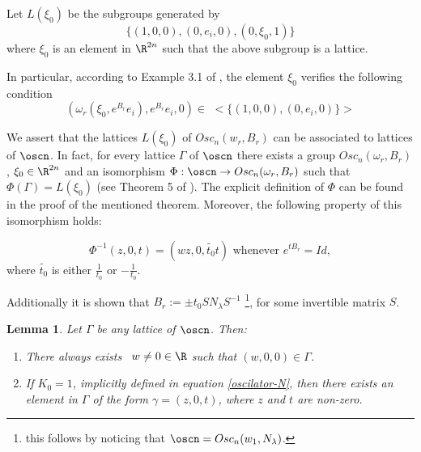 \documentclass[12pt]{amsart}
\theoremstyle{plain}
\newtheorem{lem}[thm]{Lemma}
\theoremstyle{definition}
\theoremstyle{remark}
\begin{document}
	Let $L(\xi_0)$ be the subgroups generated by $$\{ (1,0,0),(0,e_i,0),(0,\xi_0, 1) \}$$ where $\xi_0$ is an element in $\R^{2n}$ such that the above subgroup is a lattice. 
	
In particular, according to Example 3.1 of \cite{MF}, the element $\xi_0$ verifies the following condition 
	\begin{equation}\label{xi-condition}
		(\omega_r(\xi_0, e^{B_r}e_i), e^{B_r} e_i, 0) \in \,\, <\{ (1,0,0),(0,e_i,0) \}>
	\end{equation}
	
	
We assert that  the lattices $L(\xi_0)$ of $Osc_n(w_r, B_r)$ can be associated to lattices of $\oscn$. In fact, for every lattice $\Gamma$ of $\oscn$ there exists a group $Osc_n(\omega_r, B_r)$, $\xi_0 \in \R^{2n}$ and an isomorphism $\Phi: \oscn \rightarrow Osc_n(\omega_r, B_r)$ such that $\Phi(\Gamma) = L(\xi_0)$ (see Theorem 5 of \cite{MF}). 	
	The explicit definition of $\Phi$ can be found in the proof of the mentioned theorem. Moreover, the following property of this isomorphism holds:
	
	\begin{equation} \label{condition-exp}
		\Phi^{-1}(z,0,t) = (w z, 0, \widetilde{t_0} t ) \mbox{ whenever } e^{t B_r} = Id,
		\end{equation}
    where $\widetilde{t_0}$ is either $\frac{1}{t_0}$ or $-\frac{1}{t_0}$.

	Additionally it is shown that $B_r := \pm t_0 S N_{\lambda} S^{-1}$ \footnote{this follows by  noticing that $\oscn = Osc_n(w_{1}, N_{\lambda})$.}, for some invertible matrix $S$. 
	
	\begin{lem}\cite{MF}\label{oscilador-elementos} 
		Let $\Gamma$ be any lattice of $\oscn$. Then:
		\begin{enumerate}
			\item There always exists \, $w \neq 0 \in \R$ such that $(w,0,0) \in \Gamma$.
			\item If $K_0=1$, implicitly defined in equation \ref{oscilator-N}, then there exists an element in $\Gamma$ of the form $\gamma = (z, 0, t)$, where $z$ and $t$ are non-zero.
		\end{enumerate}
	\end{lem} 
	
\end{document}
